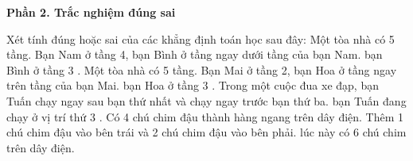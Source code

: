 \textbf{Phần 2. Trắc nghiệm đúng sai}

\begin{ex} %
Xét tính đúng hoặc sai của các khẳng định toán học sau đây:
\choiceTF
{\True Một tòa nhà có 5 tầng. Bạn Nam ở tầng 4, bạn Bình ở tầng ngay dưới tầng của bạn Nam. bạn Bình ở tầng $3$ .}
{\True Một tòa nhà có 5 tầng. Bạn Mai ở tầng 2, bạn Hoa ở tầng ngay trên tầng của bạn Mai. bạn Hoa ở tầng $3$ .}
{Trong một cuộc đua xe đạp, bạn Tuấn chạy ngay sau bạn thứ nhất và chạy ngay trước bạn thứ ba. bạn Tuấn đang chạy ở vị trí thứ $3$ .}
{Có 4 chú chim đậu thành hàng ngang trên dây điện. Thêm 1 chú chim đậu vào bên trái và 2 chú chim đậu vào bên phải. lúc này có $6$ chú chim trên dây điện.}
\end{ex}

